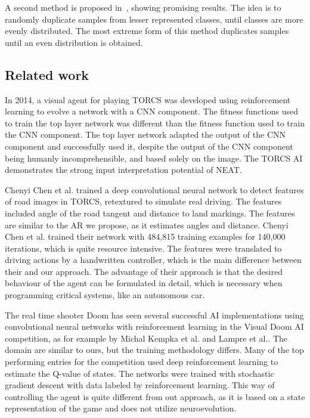 A second method is proposed in~\cite{balanced-classes}, showing promising results. The idea is to randomly duplicate samples from lesser represented classes, until classes are more evenly distributed. The most extreme form of this method duplicates samples until an even distribution is obtained.
\subsection{Related work}
\label{sec:relatedwork}
In 2014, a visual agent for playing TORCS was developed using reinforcement learning to evolve a network with a CNN component\cite{torcs}. The fitness functions used to train the top layer network was different than the fitness function used to train the CNN component. The top layer network adapted the output of the CNN component and successfully used it, despite the output of the CNN component being humanly incomprehensible, and based solely on the image. The TORCS AI demonstrates the strong input interpretation potential of NEAT.

Chenyi Chen et al. \cite{chen} trained a deep convolutional neural network to detect features of road images in TORCS, retextured to simulate real driving. The features included angle of the road tangent and distance to land markings. The features are similar to the AR we propose, as it estimates angles and distance. Chenyi Chen et al. trained their network with 484,815 training examples for 140,000 iterations, which is quite resource intensive. The features were translated to driving actions by a handwritten controller, which is the main difference between their and our approach. The advantage of their approach is that the desired behaviour of the agent can be formulated in detail, which is necessary when programming critical systems, like an autonomous car.

The real time shooter Doom has seen several successful AI implementations using convolutional neural networks with reinforcement learning in the Visual Doom AI competition, as for example by Michal Kempka et al.\cite{vizdoom} and Lampre et al.\cite{DBLP:journals/corr/LampleC16}. The domain are similar to ours, but the training methodology differs. Many of the top performing entries for the competition used deep reinforcement learning to estimate the Q-value of states. The networks were trained with stochastic gradient descent with data labeled by reinforcement learning. This way of controlling the agent is quite different from out approach, as it is based on a state representation of the game and does not utilize neuroevolution.

